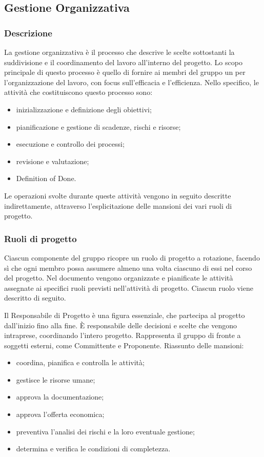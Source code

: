 \subsection{Gestione Organizzativa}
	
		\subsubsection{Descrizione}
			La gestione organizzativa è il processo che descrive le scelte sottostanti la suddivisione e il coordinamento del lavoro all'interno del progetto. Lo scopo principale di questo processo è quello di fornire ai membri del gruppo un \PdP{} per l'organizzazione del lavoro, con focus sull'efficacia e l'efficienza. Nello specifico, le attività che costituiscono questo processo sono:
			\begin{itemize}
				\item {inizializzazione e definizione degli obiettivi;}
				\item {pianificazione e gestione di scadenze, rischi e risorse;}
				\item {esecuzione e controllo dei processi;}
				\item {revisione e valutazione;}
				\item {Definition of Done.}
			\end{itemize}
			Le operazioni svolte durante queste attività vengono in seguito descritte indirettamente, attraverso l'esplicitazione delle mansioni dei vari ruoli di progetto.
			
			\subsubsection{Ruoli di progetto}
			Ciascun componente del gruppo ricopre un ruolo di progetto a rotazione, facendo sì che ogni membro possa assumere almeno una volta ciascuno di essi nel corso del progetto. Nel documento  vengono organizzate e pianificate le attività assegnate ai specifici ruoli previsti nell'attività di progetto. Ciascun ruolo viene descritto di seguito.
			
			Il Responsabile di Progetto è una figura essenziale, che partecipa al progetto dall'inizio fino alla fine. È responsabile delle decisioni e scelte che vengono intraprese, coordinando l'intero progetto. Rappresenta il gruppo di fronte a soggetti esterni, come Committente e Proponente.
			Riassunto delle mansioni:
			\begin{itemize}
				\item coordina, pianifica e controlla le attività;
				\item gestisce le risorse umane;
				\item approva la documentazione;
				\item approva l'offerta economica;
				\item preventiva l'analisi dei rischi e la loro eventuale gestione;
				\item determina e verifica le condizioni di completezza.
			\end{itemize}
			
